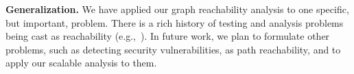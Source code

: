 \textbf{Generalization.}
We have applied our graph reachability analysis to one specific, but
important, problem.  There is a rich history of testing and analysis
problems being cast as reachability (e.g.,~\cite{RepsHS95}).  In future
work, we plan to formulate other problems, such as detecting security
vulnerabilities, as path reachability, and to apply our scalable analysis
to them.






